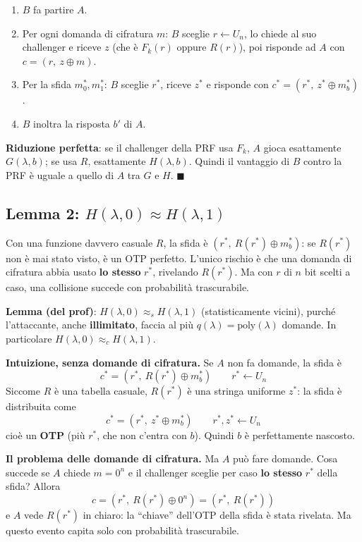 \begin{enumerate}
  \item \(B\) fa partire \(A\).
  \item Per ogni domanda di cifratura \(m\): \(B\) sceglie \(r \leftarrow U_n\), lo chiede al suo challenger e riceve \(z\) (che è \(F_k(r)\) oppure \(R(r)\)), poi risponde ad \(A\) con \(c = (r,\ z \oplus m)\).
  \item Per la sfida \(m_0^*, m_1^*\): \(B\) sceglie \(r^*\), riceve \(z^*\) e risponde con \(c^* = (r^*,\ z^* \oplus m_b^*)\).
  \item \(B\) inoltra la risposta \(b'\) di \(A\).
\end{enumerate}

\textbf{Riduzione perfetta}: se il challenger della PRF usa \(F_k\), \(A\) gioca esattamente \(G(\lambda, b)\); se usa \(R\), esattamente \(H(\lambda, b)\). Quindi il vantaggio di \(B\) contro la PRF è uguale a quello di \(A\) tra \(G\) e \(H\). \(\blacksquare\)

\subsection{Lemma 2: \texorpdfstring{\(H(\lambda, 0) \approx H(\lambda, 1)\)}{H0 ≈ H1}}

\begin{inbreve}
Con una funzione davvero casuale \(R\), la sfida è \((r^*,\ R(r^*) \oplus m_b^*)\): se \(R(r^*)\) non è mai stato visto, è un OTP perfetto. L'unico rischio è che una domanda di cifratura abbia usato \textbf{lo stesso} \(r^*\), rivelando \(R(r^*)\). Ma con \(r\) di \(n\) bit scelti a caso, una collisione succede con probabilità trascurabile.
\end{inbreve}

\textbf{Lemma (del prof)}: \(H(\lambda, 0) \approx_s H(\lambda, 1)\) (statisticamente vicini), purché l'attaccante, anche \textbf{illimitato}, faccia al più \(q(\lambda) = \text{poly}(\lambda)\) domande. In particolare \(H(\lambda, 0) \approx_c H(\lambda, 1)\).

\textbf{Intuizione, senza domande di cifratura.} Se \(A\) non fa domande, la sfida è
\[
c^* = (r^*,\ R(r^*) \oplus m_b^*) \qquad r^* \leftarrow U_n
\]
Siccome \(R\) è una tabella casuale, \(R(r^*)\) è una stringa uniforme \(z^*\): la sfida è distribuita come
\[
c^* = (r^*,\ z^* \oplus m_b^*) \qquad r^*, z^* \leftarrow U_n
\]
cioè un \textbf{OTP} (più \(r^*\), che non c'entra con \(b\)). Quindi \(b\) è perfettamente nascosto.

\textbf{Il problema delle domande di cifratura.} Ma \(A\) può fare domande. Cosa succede se \(A\) chiede \(m = 0^n\) e il challenger sceglie per caso \textbf{lo stesso} \(r^*\) della sfida? Allora
\[
c = (r^*,\ R(r^*) \oplus 0^n) = (r^*,\ R(r^*))
\]
e \(A\) vede \(R(r^*)\) in chiaro: la ``chiave'' dell'OTP della sfida è stata rivelata. Ma questo evento capita solo con probabilità trascurabile.

